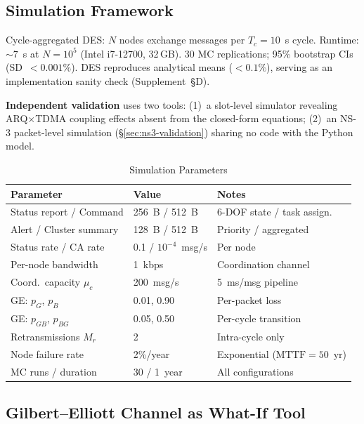 \documentclass[journal]{IEEEtran}
\begin{document}
\subsection{Simulation Framework}

Cycle-aggregated DES: $N$ nodes exchange messages per $T_c = 10$~s cycle.
Runtime: ${\sim}7$~s at $N = 10^5$ (Intel i7-12700, 32\,GB).
30 MC replications; 95\% bootstrap CIs (SD~$<\!0.001\%$).
DES reproduces analytical means ($<\!0.1\%$), serving as an implementation sanity check (Supplement~\S D).

\textbf{Independent validation} uses two tools: (1)~a slot-level simulator revealing ARQ$\times$TDMA coupling effects absent from the closed-form equations; (2)~an NS-3 packet-level simulation (\S\ref{sec:ns3-validation}) sharing no code with the Python model.

\begin{table}[t]
    \centering
    \caption{Simulation Parameters}
    \label{tab:sim_params}
    \footnotesize
    \begin{tabular}{@{}lll@{}}
        \toprule
        \textbf{Parameter} & \textbf{Value} & \textbf{Notes} \\
        \midrule
        Status report / Command & 256~B / 512~B & 6-DOF state / task assign. \\
        Alert / Cluster summary & 128~B / 512~B & Priority / aggregated \\
        Status rate / CA rate & 0.1 / $10^{-4}$~msg/s & Per node \\
        Per-node bandwidth & 1~kbps & Coordination channel \\
        Coord.\ capacity $\mu_c$ & 200~msg/s & 5~ms/msg pipeline \\
        \midrule
        GE: $p_G$, $p_B$ & 0.01, 0.90 & Per-packet loss \\
        GE: $p_{GB}$, $p_{BG}$ & 0.05, 0.50 & Per-cycle transition \\
        Retransmissions $M_r$ & 2 & Intra-cycle only \\
        \midrule
        Node failure rate & 2\%/year & Exponential ($\text{MTTF} = 50$~yr) \\
        MC runs / duration & 30 / 1~year & All configurations \\
        \bottomrule
    \end{tabular}
\end{table}

\subsection{Gilbert--Elliott Channel as What-If Tool}
\label{sec:ge_link}
\end{document}
